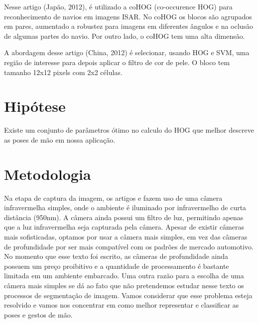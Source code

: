 Nesse artigo \cite{ref8} (Japão, 2012), é utilizado a coHOG (co-occurence HOG) para reconhecimento de navios em imagens ISAR. No coHOG os blocos são agrupados em pares, aumentado a robustez para imagens em diferentes ângulos e na oclusão de algumas partes do navio. Por outro lado, o coHOG tem uma alta dimensão.


A abordagem desse artigo \cite{ref10} (China, 2012) é selecionar, usando HOG e SVM, uma região de interesse para depois aplicar o filtro de cor de pele. O bloco tem tamanho 12x12 pixels com 2x2 células.


\section{Hipótese}

Existe um conjunto de parâmetros ótimo no calculo do HOG que melhor descreve as poses de mão em nossa aplicação.

\section{Metodologia}

Na etapa de captura da imagem, os artigos \cite{ref2} e \cite{ref1} fazem uso de uma câmera infravermelha simples, onde o ambiente é iluminado por infravermelho de curta distância (950nm). A câmera ainda possui um filtro de luz, permitindo apenas que a luz infravermelha seja capturada pela câmera. Apesar de existir câmeras mais sofisticadas, optamos por usar a câmera mais simples, em vez das câmeras de profundidade por ser mais compatível com os padrões de mercado automotivo. No momento que esse texto foi escrito, as câmeras de profundidade ainda possuem um preço proibitivo e a quantidade de processamento é bastante limitada em um ambiente embarcado. Uma outra razão para a escolha de uma câmera mais simples se dá ao fato que não pretendemos estudar nesse texto os processos de segmentação de imagem. Vamos considerar que esse problema esteja resolvido e vamos nos concentrar em como melhor representar e classificar as poses e gestos de mão.


